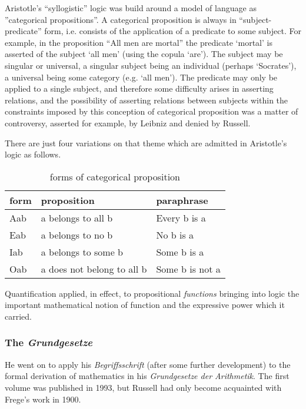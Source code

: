\documentclass[10pt,titlepage]{book}
\begin{document}
Aristotle's ``syllogistic'' logic was build around a model of language as ''categorical propositions''.
A categorical proposition is always in ``subject-predicate'' form, i.e. consists of the application of a predicate to some subject.
For example, in the proposition ``All men are mortal'' the predicate `mortal' is asserted of the subject `all men' (using the copula `are').
The subject may be singular or universal, a singular subject being an individual (perhaps `Socrates'), a universal being some category (e.g. `all men').
The predicate may only be applied to a single subject, and therefore some difficulty arises in asserting relations, and the possibility of asserting relations between subjects within the constraints imposed by this conception of categorical proposition was a matter of controversy, asserted for example, by Leibniz and denied by Russell.

There are just four variations on that theme which are admitted in Aristotle's logic as follows.

\begin{table}[h]
\begin{center}
  \caption{forms of categorical proposition}
\begin{tabular}{|l|l|l|}
\hline
form & proposition & paraphrase \\
\hline
Aab &	a belongs to all b & Every b is a \\
Eab &	a belongs to no b & No b is a \\
Iab &	a belongs to some b & Some b is a \\
Oab &	a does not belong to all b & Some b is not a \\
\hline
\end{tabular}
\end{center}
\end{table}

Quantification applied, in effect, to propositional {\it functions} bringing into logic the important mathematical notion of function and the expressive power which it carried.

\subsubsection{The {\it Grundgesetze}}

He went on to apply his {\it Begriffsschrift} (after some further development) to the formal derivation of mathematics in his \emph{Grundgesetze der Arithmetik}\cite{frege1893,frege1903}.
The first volume was published in 1993, but Russell had only become acquainted with Frege's work in 1900.
\end{document}
